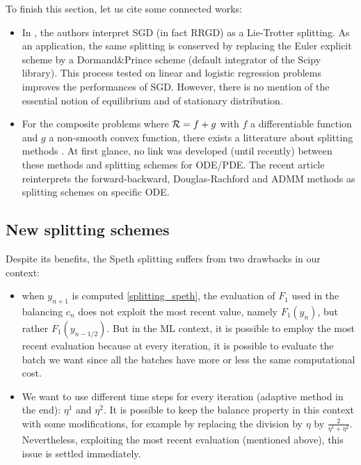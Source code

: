 \begin{remark}
	To finish this section, let us cite some connected works:
	\begin{itemize}
		\item In \cite{splitting_sgd}, the authors interpret SGD (in fact RRGD) as a Lie-Trotter splitting. As an application, the same splitting is conserved by replacing the Euler explicit scheme by a Dormand\&Prince scheme (default integrator of the Scipy library). This process tested on linear and logistic regression problems improves the performances of SGD. However, there is no mention of the essential notion of equilibrium and of stationary distribution. 
		\item For the composite problems where $\mathcal{R}=f+g$ with $f$ a differentiable function and $g$ a non-smooth convex function, there exists a litterature about splitting methods \cite{splitting_proximal}. At first glance, no link was developed (until recently) between these methods and splitting schemes for ODE/PDE. The recent article \cite{splitting_proximal_ode} reinterprets the forward-backward, Douglas-Rachford and ADMM methods as splitting schemes on specific ODE.   
	\end{itemize}
\end{remark}

\subsection{New splitting schemes}
\label{new_splitting}

Despite its benefits, the Speth splitting suffers from two drawbacks in our context:
\begin{itemize}
	\item when $y_{n+1}$ is computed \eqref{splitting_speth}, the evaluation of $F_1$ used in the balancing $c_n$ does not exploit the most recent value, namely $F_1(y_n)$, but rather $F_1(y_{n-1/2})$. But in the ML context, it is possible to employ the most recent evaluation because at every iteration, it is possible to evaluate the batch we want since all the batches have more or less the same computational cost. 
	\item We want to use different time steps for every iteration (adaptive method in the end): $\eta^1$ and $\eta^2$. It is possible to keep the balance property in this context with some modifications, for example by replacing the division by $\eta$ by $\frac{2}{\eta^1+\eta^2}$. Nevertheless, exploiting the most recent evaluation (mentioned above), this issue is settled immediately. 
\end{itemize}

